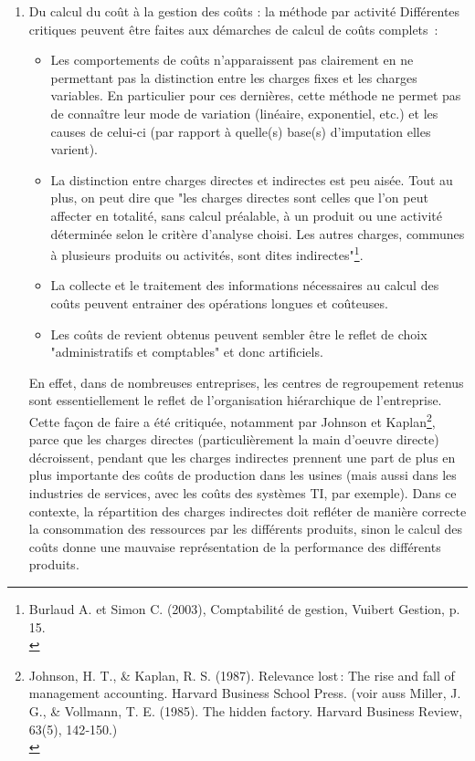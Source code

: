 \documentclass{tufte-handout}
\begin{document}
\begin{enumerate}
\item Du calcul du coût à la gestion des coûts : la méthode par activité
\label{sec:org2245d7c}
Différentes critiques peuvent être faites aux démarches de calcul de coûts complets :\\
\begin{itemize}
\item Les comportements de coûts n'apparaissent pas clairement en ne permettant pas la distinction entre les charges fixes et les charges variables. En particulier pour ces dernières, cette méthode ne permet pas de connaître leur mode de variation (linéaire, exponentiel, etc.) et les causes de celui-ci (par rapport à quelle(s) base(s) d'imputation elles varient).\\
\item La distinction entre charges directes et indirectes est peu aisée. Tout au plus, on peut dire que "les charges directes sont celles que l'on peut affecter en totalité, sans calcul préalable, à un produit ou une activité déterminée selon le critère d'analyse choisi. Les autres charges, communes à plusieurs produits ou activités, sont dites indirectes"\footnote{Burlaud A. et Simon C. (2003), Comptabilité de gestion, Vuibert Gestion, p. 15.\\}.\\
\item La collecte et le traitement des informations nécessaires au calcul des coûts peuvent entrainer des opérations longues et coûteuses.\\
\item Les coûts de revient obtenus peuvent sembler être le reflet de choix "administratifs et comptables" et donc artificiels.\\
\end{itemize}

En effet, dans de nombreuses entreprises, les centres de regroupement retenus sont essentiellement le reflet de l'organisation hiérarchique de l'entreprise. Cette façon de faire a été critiquée, notamment par Johnson et Kaplan\footnote{Johnson, H. T., \& Kaplan, R. S. (1987). Relevance lost : The rise and fall of management accounting. Harvard Business School Press. (voir auss Miller, J. G., \& Vollmann, T. E. (1985). The hidden factory. Harvard Business Review, 63(5), 142‑150.)\\}, parce que les charges directes (particulièrement la main d'oeuvre directe) décroissent, pendant que les charges indirectes prennent une part de plus en plus importante des coûts de production dans les usines (mais aussi dans les industries de services, avec les coûts des systèmes TI, par exemple). Dans ce contexte, la répartition des charges indirectes doit refléter de manière correcte la consommation des ressources par les différents produits, sinon le calcul des coûts donne une mauvaise représentation de la performance des différents produits.\\


\end{enumerate}
\end{document}
